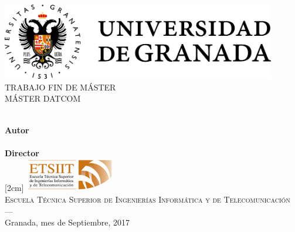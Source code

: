 \begin{titlepage}


\newlength{\centeroffset}
\setlength{\centeroffset}{-0.5\oddsidemargin}
\addtolength{\centeroffset}{0.5\evensidemargin}
\thispagestyle{empty}

\noindent\hspace*{\centeroffset}\begin{minipage}{\textwidth}

\centering
\includegraphics[width=0.9\textwidth]{imagenes/logo_ugr.png}\\[1.4cm]

\textsc{ \Large TRABAJO FIN DE MÁSTER\\[0.2cm]}
\textsc{
  MÁSTER DATCOM}\\[1cm]
%
{\Huge\bfseries \myTitle}\\
\end{minipage}

\vspace{2.5cm}
\noindent\hspace*{\centeroffset}\begin{minipage}{\textwidth}
\centering

\textbf{Autor}\\ {\myName} \\[2.5ex]
\textbf{Director} \\ {\myProf} [2cm]
\includegraphics[width=0.3\textwidth]{imagenes/etsiit_logo.png} \\[0.1cm]
\textsc{Escuela Técnica Superior de Ingenierías Informática y de Telecomunicación}\\
\textsc{---}\\
Granada, mes de Septiembre, 2017
\end{minipage}
\end{titlepage}
